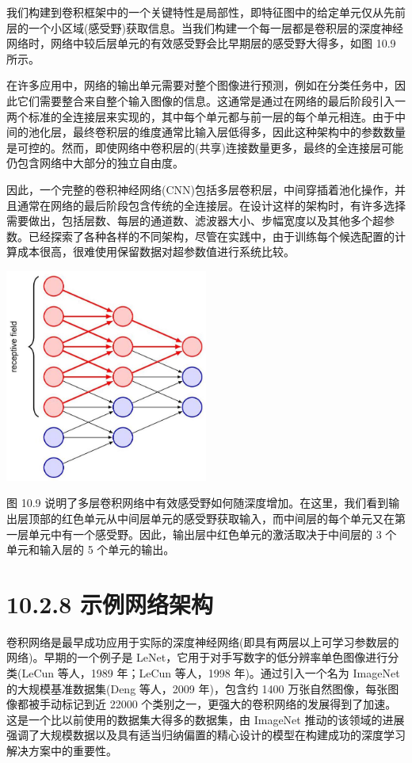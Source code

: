 \documentclass[10pt]{report}
\begin{document}
我们构建到卷积框架中的一个关键特性是局部性，即特征图中的给定单元仅从先前层的一个小区域(感受野)获取信息。当我们构建一个每一层都是卷积层的深度神经网络时，网络中较后层单元的有效感受野会比早期层的感受野大得多，如图 10.9 所示。

在许多应用中，网络的输出单元需要对整个图像进行预测，例如在分类任务中，因此它们需要整合来自整个输入图像的信息。这通常是通过在网络的最后阶段引入一两个标准的全连接层来实现的，其中每个单元都与前一层的每个单元相连。由于中间的池化层，最终卷积层的维度通常比输入层低得多，因此这种架构中的参数数量是可控的。然而，即使网络中卷积层的(共享)连接数量更多，最终的全连接层可能仍包含网络中大部分的独立自由度。

因此，一个完整的卷积神经网络(CNN)包括多层卷积层，中间穿插着池化操作，并且通常在网络的最后阶段包含传统的全连接层。在设计这样的架构时，有许多选择需要做出，包括层数、每层的通道数、滤波器大小、步幅宽度以及其他多个超参数。已经探索了各种各样的不同架构，尽管在实践中，由于训练每个候选配置的计算成本很高，很难使用保留数据对超参数值进行系统比较。

\begin{center}
\includegraphics[max width=0.5\textwidth]{images/0194e279-9b28-703a-88f4-c3ac21e2010d_318_902_341_649_682_0.jpg}
\end{center}
\hspace*{3em} 

图 10.9 说明了多层卷积网络中有效感受野如何随深度增加。在这里，我们看到输出层顶部的红色单元从中间层单元的感受野获取输入，而中间层的每个单元又在第一层单元中有一个感受野。因此，输出层中红色单元的激活取决于中间层的 3 个单元和输入层的 5 个单元的输出。

\section*{10.2.8 示例网络架构}

卷积网络是最早成功应用于实际的深度神经网络(即具有两层以上可学习参数层的网络)。早期的一个例子是 LeNet，它用于对手写数字的低分辨率单色图像进行分类(LeCun 等人，1989 年；LeCun 等人，1998 年)。通过引入一个名为 ImageNet 的大规模基准数据集(Deng 等人，2009 年)，包含约 1400 万张自然图像，每张图像都被手动标记到近 22000 个类别之一，更强大的卷积网络的发展得到了加速。这是一个比以前使用的数据集大得多的数据集，由 ImageNet 推动的该领域的进展强调了大规模数据以及具有适当归纳偏置的精心设计的模型在构建成功的深度学习解决方案中的重要性。
\end{document}
